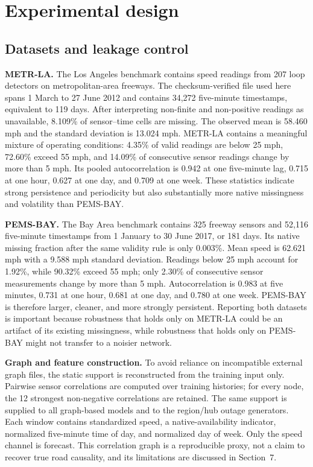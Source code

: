 \documentclass[preprint,12pt]{elsarticle}
\begin{document}
\section{Experimental design}
\subsection{Datasets and leakage control}
\textbf{METR-LA.} The Los Angeles benchmark contains speed readings from 207
loop detectors on metropolitan-area freeways. The checksum-verified file used
here spans 1 March to 27 June 2012 and contains 34,272 five-minute timestamps,
equivalent to 119 days. After interpreting non-finite and non-positive readings
as unavailable, 8.109\% of sensor--time cells are missing. The observed mean is
58.460 mph and the standard deviation is 13.024 mph. METR-LA contains a
meaningful mixture of operating conditions: 4.35\% of valid readings are below
25 mph, 72.60\% exceed 55 mph, and 14.09\% of consecutive sensor readings change
by more than 5 mph. Its pooled autocorrelation is 0.942 at one five-minute lag,
0.715 at one hour, 0.627 at one day, and 0.709 at one week. These statistics
indicate strong persistence and periodicity but also substantially more native
missingness and volatility than PEMS-BAY.

\textbf{PEMS-BAY.} The Bay Area benchmark contains 325 freeway sensors and
52,116 five-minute timestamps from 1 January to 30 June 2017, or 181 days. Its
native missing fraction after the same validity rule is only 0.003\%. Mean speed
is 62.621 mph with a 9.588 mph standard deviation. Readings below 25 mph account
for 1.92\%, while 90.32\% exceed 55 mph; only 2.30\% of consecutive sensor
measurements change by more than 5 mph. Autocorrelation is 0.983 at five
minutes, 0.731 at one hour, 0.681 at one day, and 0.780 at one week. PEMS-BAY is
therefore larger, cleaner, and more strongly persistent. Reporting both
datasets is important because robustness that holds only on METR-LA could be an
artifact of its existing missingness, while robustness that holds only on
PEMS-BAY might not transfer to a noisier network.

\textbf{Graph and feature construction.} To avoid reliance on incompatible
external graph files, the static support is reconstructed from the training
input only. Pairwise sensor correlations are computed over training histories;
for every node, the 12 strongest non-negative correlations are retained. The
same support is supplied to all graph-based models and to the region/hub outage
generators. Each window contains standardized speed, a native-availability
indicator, normalized five-minute time of day, and normalized day of week.
Only the speed channel is forecast. This correlation graph is a reproducible
proxy, not a claim to recover true road causality, and its limitations are
discussed in Section~7.
\end{document}
